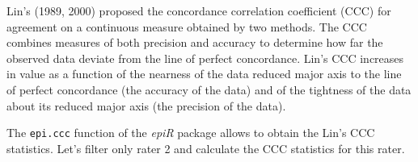 \documentclass[
  letterpaper,
  DIV=11,
  numbers=noendperiod]{scrreprt}
\newenvironment{Shaded}{\begin{snugshade}}{\end{snugshade}}
\newcommand{\CommentTok}[1]{\textcolor[rgb]{0.37,0.37,0.37}{#1}}
\newcommand{\DecValTok}[1]{\textcolor[rgb]{0.68,0.00,0.00}{#1}}
\newcommand{\FunctionTok}[1]{\textcolor[rgb]{0.28,0.35,0.67}{#1}}
\newcommand{\NormalTok}[1]{\textcolor[rgb]{0.00,0.23,0.31}{#1}}
\newcommand{\OtherTok}[1]{\textcolor[rgb]{0.00,0.23,0.31}{#1}}
\newcommand{\SpecialCharTok}[1]{\textcolor[rgb]{0.37,0.37,0.37}{#1}}
\newcommand{\StringTok}[1]{\textcolor[rgb]{0.13,0.47,0.30}{#1}}
\begin{document}
Lin's (1989, 2000) proposed the concordance correlation coefficient
(CCC) for agreement on a continuous measure obtained by two methods. The
CCC combines measures of both precision and accuracy to determine how
far the observed data deviate from the line of perfect concordance.
Lin's CCC increases in value as a function of the nearness of the data
reduced major axis to the line of perfect concordance (the accuracy of
the data) and of the tightness of the data about its reduced major axis
(the precision of the data).

The \texttt{epi.ccc} function of the \emph{epiR} package allows to
obtain the Lin's CCC statistics. Let's filter only rater 2 and calculate
the CCC statistics for this rater.

\begin{Shaded}
\end{Shaded}
\end{document}
